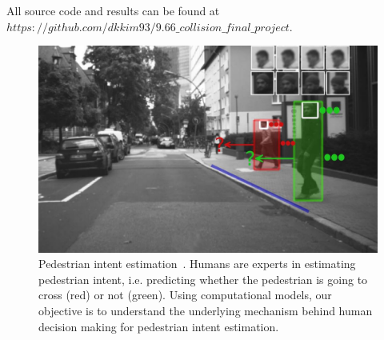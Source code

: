 All source code and results can be found at 
$https://github.com/dkkim93/9.66\_collision\_final\_project$.

\begin{figure}[t]
  \centering
  \includegraphics[width=\linewidth]{figures/motivaton.png}
  \caption{Pedestrian intent estimation~\cite{Kooij2018}. Humans are experts in estimating pedestrian intent, i.e. predicting whether the pedestrian is going to cross (red) or not (green). 
  Using computational models, our objective is to understand the underlying mechanism behind human decision making for pedestrian intent estimation.}
  \label{fig:overview}
\end{figure}